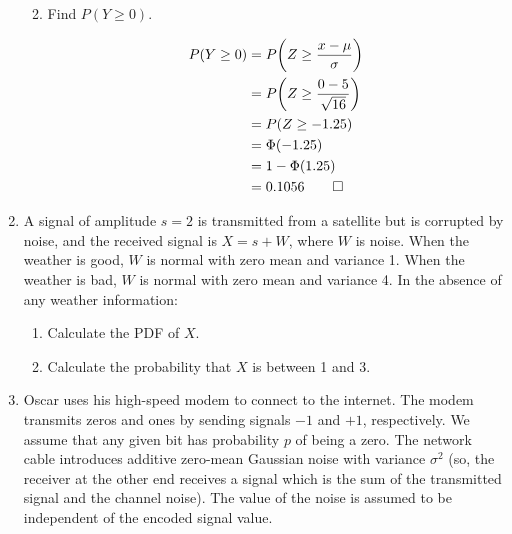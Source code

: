 \documentclass[paper=usletter, fontsize=12pt]{article}
\begin{document}
\begin{enumerate}
\begin{enumerate}
\begin{cproof}
            \end{cproof}

            \item Find $P(Y\ge 0)$.
            \begin{cproof}

                \begin{align*}
                    P(Y\ge 0) & = P\bigg(Z\ge \frac{x-\mu}{\sigma} \bigg)\\
                    & = P\bigg(Z\ge \frac{0-5}{\sqrt{16}} \bigg)\\
                    & = P(Z\ge -1.25)\\
                    & = \Phi(-1.25)\\
                    & = 1-\Phi(1.25)\\
                    & = 0.1056 \qedhere
                \end{align*}
                \endgroup

            \end{cproof}

        \end{enumerate}

        \item A signal of amplitude $s = 2$ is transmitted from a satellite but
        is corrupted by noise, and the received signal is $X = s+W$, where $W$
        is noise. When the weather is good, $W$ is normal with zero mean and
        variance 1. When the weather is bad, $W$ is normal with zero mean and
        variance 4. In the absence of any weather information:
        \begin{enumerate}

            \item Calculate the PDF of $X$.
            \begin{cproof}
            \end{cproof}

            \item Calculate the probability that $X$ is between 1 and 3.
            \begin{cproof}
            \end{cproof}

        \end{enumerate}

        \item Oscar uses his high-speed modem to connect to the internet. The
        modem transmits zeros and ones by sending signals $-1$ and $+1$,
        respectively. We assume that any given bit has probability $p$ of being
        a zero. The network cable introduces additive zero-mean Gaussian noise
        with variance $\sigma^2$ (so, the receiver at the other end receives a
        signal which is the sum of the transmitted signal and the channel
        noise). The value of the noise is assumed to be independent of the
        encoded signal value.
        \begin{enumerate}


\end{enumerate}
\end{enumerate}
\end{document}
